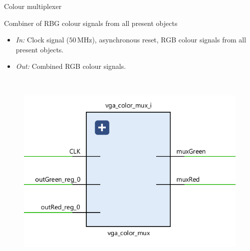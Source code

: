 \documentclass[aspectratio=169, 11pt, hyperref={unicode}]{beamer}
\def\MHz{\,\mathrm{MHz}}
\begin{document}
\begin{frame}{Colour multiplexer}
    \begin{minipage}{.45\textwidth}
        Combiner of RBG colour signals from all present objects
        \begin{itemize}
            \item \emph{In:} Clock signal ($50\MHz$), asynchronous reset, RGB colour signals from all present objects.
            \item \emph{Out:} Combined RGB colour signals.
        \end{itemize}
    \end{minipage}
    ~
    \begin{minipage}{.45\textwidth}
        \begin{figure}[!ht]
            \centering
            \includegraphics[width=\textwidth]{src/color-mux.png}
        \end{figure}
    \end{minipage}
\end{frame}
\end{document}
